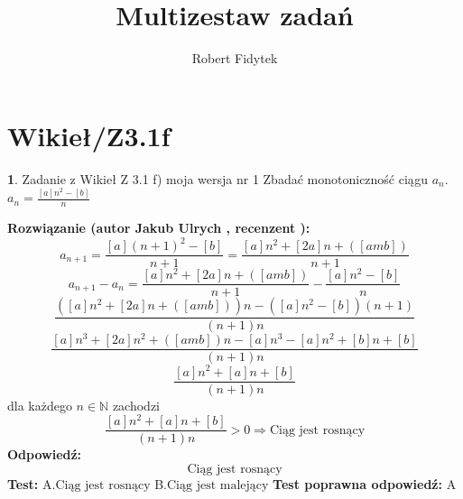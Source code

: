 \documentclass[12pt, a4paper]{article}
\title{Multizestaw zadań}
\author{Robert Fidytek}
\date{}
\theoremstyle{definition} %
\newtheorem{zad}{}
\newcommand{\kategoria}[1]{\section{#1}} %
\newcommand{\zadStart}[1]{\begin{zad}#1\newline} %
\newcommand{\zadStop}{\end{zad}}   %
\newcommand{\rozwStart}[2]{\noindent \textbf{Rozwiązanie (autor #1 , recenzent #2): }\newline} %
\newcommand{\rozwStop}{\newline}                                            %
\newcommand{\odpStart}{\noindent \textbf{Odpowiedź:}\newline}    %
\newcommand{\odpStop}{\newline}                                             %
\newcommand{\testStart}{\noindent \textbf{Test:}\newline} %
\newcommand{\testStop}{\newline} %
\newcommand{\kluczStart}{\noindent \textbf{Test poprawna odpowiedź:}\newline} %
\newcommand{\kluczStop}{\newline} %
\begin{document}
\maketitle


\kategoria{Wikieł/Z3.1f}
\zadStart{Zadanie z Wikieł Z 3.1 f) moja wersja nr 1}
Zbadać monotoniczność ciągu $a_{n}$.\\ $a_{n}=\frac{[a]n^{2}-[b]}{n}$
\zadStop
\rozwStart{Jakub Ulrych}{}
$$a_{n+1}=\frac{[a](n+1)^{2}-[b]}{n+1}=\frac{[a]n^{2}+[2a]n+([amb])}{n+1}$$
$$a_{n+1}-a_{n}=\frac{[a]n^{2}+[2a]n+([amb])}{n+1}-\frac{[a]n^{2}-[b]}{n}$$
$$\frac{([a]n^{2}+[2a]n+([amb]))n-([a]n^{2}-[b])(n+1)}{(n+1)n}$$
$$\frac{[a]n^{3}+[2a]n^{2}+([amb])n-[a]n^{3}-[a]n^{2}+[b]n+[b]}{(n+1)n}$$
$$\frac{[a]n^{2}+[a]n+[b]}{(n+1)n}$$
dla każdego $n\in\mathbb{N}$ zachodzi
$$\frac{[a]n^{2}+[a]n+[b]}{(n+1)n}>0\Rightarrow \text{Ciąg jest rosnący}$$
\rozwStop
\odpStart
$$\text{Ciąg jest rosnący}$$
\odpStop
\testStart
A.$\text{Ciąg jest rosnący}$
B.$\text{Ciąg jest malejący}$
\testStop
\kluczStart
A
\kluczStop
\end{document}
